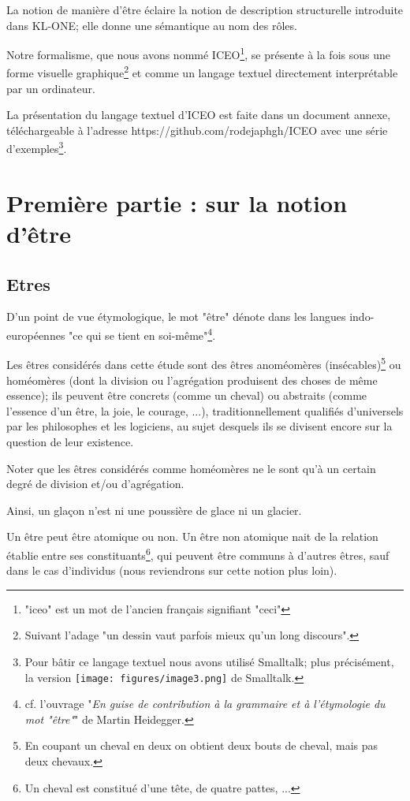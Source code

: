 \documentclass[a4paper, 12pt, openright, french]{book}
\begin{document}
La notion de manière d'être éclaire la notion de description structurelle introduite dans KL-ONE; elle donne une sémantique au nom des rôles.

Notre formalisme, que nous avons nommé ICEO\footnote{"iceo" est un mot de l'ancien
	français signifiant "ceci"}, se présente à la fois sous une forme visuelle graphique\footnote{Suivant l'adage "un dessin vaut
	parfois mieux qu'un long discours".}
et comme un langage textuel directement interprétable par un
ordinateur. 

La présentation du langage textuel d'ICEO
est faite dans un document annexe, téléchargeable à l'adresse https://github.com/rodejaphgh/ICEO avec une série d'exemples\footnote{Pour bâtir ce langage textuel nous avons utilisé
	Smalltalk; plus précisément, la version
	\texttt{[image: figures/image3.png]}
	de Smalltalk.}.


\part{Première partie : sur la notion
d'être}


\cleardoublepage
\chapter{Etres}

D'un point de vue étymologique, le mot "être" dénote
dans les langues indo-européennes "ce qui se tient en
soi-même"\footnote{cf. l'ouvrage "\emph{En guise de
		contribution à la grammaire et à l'étymologie du mot
		"être"}" de Martin Heidegger.}.

Les êtres considérés dans cette étude sont des êtres anoméomères
(insécables)\footnote{En coupant un cheval en deux on obtient deux bouts
	de cheval, mais pas deux chevaux.} ou homéomères (dont la division ou
l'agrégation produisent des choses de même essence); ils
peuvent être concrets (comme un cheval) ou abstraits (comme
l'essence d'un être, la joie, le
courage, ...), traditionnellement qualifiés d'universels
par les philosophes et les logiciens, au sujet desquels ils se divisent
encore sur la question de leur existence.

Noter que les êtres considérés comme homéomères ne le sont
qu'à un certain degré de division et/ou
d'agrégation.

Ainsi, un glaçon n'est ni une poussière de glace ni un
glacier.

Un être peut être atomique ou non. Un être non atomique nait de la
relation établie entre ses constituants\footnote{Un cheval est constitué d'une tête,
	de quatre pattes, ... }, qui peuvent
être communs à d'autres êtres, sauf dans le cas
d'individus (nous reviendrons sur cette notion plus
loin).
\end{document}
